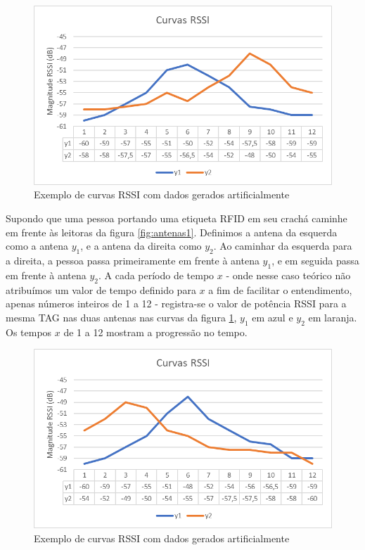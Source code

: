 \begin{figure}[H]
    \centering
    \includegraphics[width=0.8\linewidth]{figs/Metodologia/image001.png}
    \caption{Exemplo de curvas RSSI com dados gerados artificialmente}
    \label{fig:rssicurvesmet1}
\end{figure}


 Supondo que uma pessoa portando uma etiqueta RFID em seu crachá caminhe em frente às leitoras da figura \ref{fig:antenas1}. Definimos a antena da esquerda como a antena $y_1$, e a antena da direita como $y_2$. Ao caminhar da esquerda para a direita, a pessoa passa primeiramente em frente à antena $y_1$, e em seguida passa em frente à antena $y_2$. A cada período de tempo $x$ - onde nesse caso teórico não atribuímos um valor de tempo definido para $x$ a fim de facilitar o entendimento, apenas números inteiros de 1 a 12 - registra-se o valor de potência RSSI para a mesma TAG nas duas antenas nas curvas da figura \ref{fig:rssicurvesmet1}, $y_1$ em azul e $y_2$ em laranja. Os tempos $x$ de 1 a 12 mostram a progressão no tempo.
 
 \begin{figure}[h]
    \centering
    \includegraphics[width=0.8\linewidth]{figs/Metodologia/image005.png}
    \caption{Exemplo de curvas RSSI com dados gerados artificialmente}
    \label{fig:rssicurvesmet2}
\end{figure}
 
